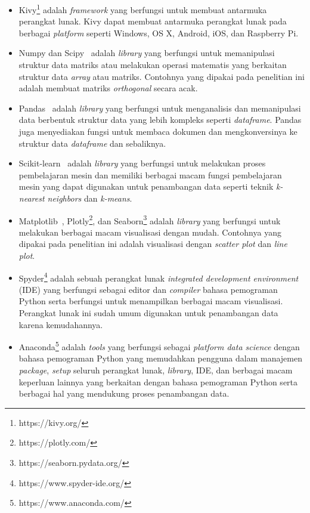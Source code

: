 \begin{itemize}
	\item Kivy\footnote{https://kivy.org/} adalah \textit{framework} yang berfungsi untuk membuat antarmuka perangkat lunak. Kivy dapat membuat antarmuka perangkat lunak pada berbagai \textit{platform} seperti Windows, OS X, Android, iOS, dan Raspberry Pi.
	\item Numpy dan Scipy~\cite{2020SciPy-NMeth} adalah \textit{library} yang berfungsi untuk memanipulasi struktur data matriks atau melakukan operasi matematis yang berkaitan struktur data \textit{array} atau matriks. Contohnya yang dipakai pada penelitian ini adalah membuat matriks \textit{orthogonal} secara acak.
	\item Pandas~\cite{mckinney-proc-scipy-2010} adalah \textit{library} yang berfungsi untuk menganalisis dan memanipulasi data berbentuk struktur data yang lebih kompleks seperti \textit{dataframe}. Pandas juga menyediakan fungsi untuk membaca dokumen dan mengkonversinya ke struktur data \textit{dataframe} dan sebaliknya.
	\item Scikit-learn~\cite{scikit-learn} adalah \textit{library} yang berfungsi untuk melakukan proses pembelajaran mesin dan memiliki berbagai macam fungsi pembelajaran mesin yang dapat digunakan untuk penambangan data seperti teknik \textit{k-nearest neighbors} dan \textit{k-means}.
	\item Matplotlib~\cite{Hunter:2007}, Plotly\footnote{https://plotly.com/}, dan Seaborn\footnote{https://seaborn.pydata.org/} adalah \textit{library} yang berfungsi untuk melakukan berbagai macam visualisasi dengan mudah. Contohnya yang dipakai pada penelitian ini adalah visualisasi dengan \textit{scatter plot} dan \textit{line plot}.
	\item Spyder\footnote{https://www.spyder-ide.org/} adalah sebuah perangkat lunak \textit{integrated development environment} (IDE) yang berfungsi sebagai editor dan \textit{compiler} bahasa pemograman Python serta berfungsi untuk menampilkan berbagai macam visualisasi. Perangkat lunak ini sudah umum digunakan untuk penambangan data karena kemudahannya.
	\item Anaconda\footnote{https://www.anaconda.com/} adalah \textit{tools} yang berfungsi sebagai \textit{platform data science} dengan bahasa pemograman Python yang memudahkan pengguna dalam manajemen \textit{package}, \textit{setup} seluruh perangkat lunak, \textit{library}, IDE, dan berbagai macam keperluan lainnya yang berkaitan dengan bahasa pemograman Python serta berbagai hal yang mendukung proses penambangan data.
\end{itemize}